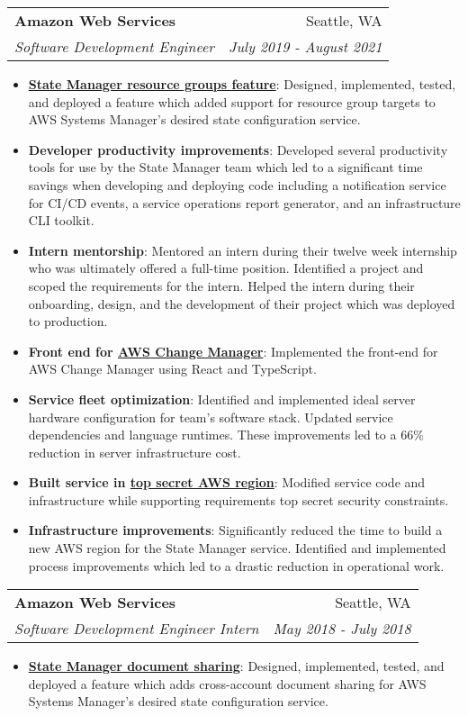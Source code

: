 \documentclass[letterpaper,11pt]{article}
\makeatletter
\newcommand{\resumeItem}[2]{
  \item\small{
    \textbf{#1}{: #2 \vspace{-2pt}}
  }
}
\newcommand{\resumeSubheading}[4]{
  \vspace{-1pt}\item
    \begin{tabular*}{0.97\textwidth}[t]{l@{\extracolsep{\fill}}r}
      \textbf{#1} & #2 \\
      \textit{\small#3} & \textit{\small #4} \\
    \end{tabular*}\vspace{-5pt}
}
\newcommand{\resumeItemListStart}{\begin{itemize}}
\newcommand{\resumeItemListEnd}{\end{itemize}\vspace{-5pt}}
\makeatother
\begin{document}
    \resumeSubheading
      {Amazon Web Services}{Seattle, WA}
      {Software Development Engineer}{July 2019 - August 2021}
      \resumeItemListStart
        \resumeItem{\href{https://aws.amazon.com/about-aws/whats-new/2020/05/aws-systems-manager-now-supports-resource-groups-as-targets-for-state-manager/}{State Manager resource groups feature}}
          {Designed, implemented, tested, and deployed a feature which added support for resource group targets to AWS Systems Manager's desired state configuration service.}
        \resumeItem{Developer productivity improvements}{Developed several productivity tools for use by the State Manager team which led to a significant time savings when developing and deploying code including a notification service for CI/CD events, a service operations report generator, and an infrastructure CLI toolkit.}
        \resumeItem{Intern mentorship}{Mentored an intern during their twelve week internship who was ultimately offered a full-time position. Identified a project and scoped the requirements for the intern. Helped the intern during their onboarding, design, and the development of their project which was deployed to production.}
        \resumeItem{Front end for \href{https://docs.aws.amazon.com/systems-manager/latest/userguide/change-manager.html}{AWS Change Manager}}{Implemented the front-end for AWS Change Manager using React and TypeScript.}
        \resumeItem{Service fleet optimization}
          {Identified and implemented ideal server hardware configuration for team's software stack. Updated service dependencies and language runtimes. These improvements led to a 66\% reduction in server infrastructure cost.}
        \resumeItem{Built service in \href{https://aws.amazon.com/blogs/publicsector/announcing-the-new-aws-secret-region/}{top secret AWS region}}{Modified service code and infrastructure while supporting requirements top secret security constraints.}
        \resumeItem{Infrastructure improvements}{Significantly reduced the time to build a new AWS region for the State Manager service. Identified and implemented process improvements which led to a drastic reduction in operational work.}
        \resumeItemListEnd
      
    \resumeSubheading
      {Amazon Web Services}{Seattle, WA}
      {Software Development Engineer Intern}{May 2018 - July 2018}
      \resumeItemListStart
        \resumeItem{\href{https://aws.amazon.com/about-aws/whats-new/2019/02/aws-systems-manager-state-manager-enables-document-sharing-across-accounts/}{State Manager document sharing}}
          {Designed, implemented, tested, and deployed a feature which adds cross-account document sharing for AWS Systems Manager's desired state configuration  service.}
      \resumeItemListEnd
\end{document}
